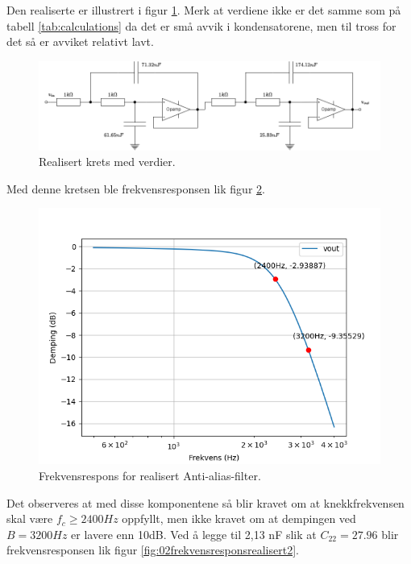 Den realiserte er illustrert i figur \ref{fig:01realised}. Merk at verdiene ikke er det samme som på tabell \ref{tab:calculations} da det er små avvik i kondensatorene, men til tross for det så er avviket relativt lavt.

\begin{figure}[!hbt]
	\centering
	\includegraphics[scale=0.45]{./Images/03Research/01realisertkrets.png}
	\caption{Realisert krets med verdier.}
	\label{fig:01realised}
\end{figure}

Med denne kretsen ble frekvensresponsen lik figur \ref{fig:02frekvensresponsrealisert}.

\begin{figure}[!hbt]
	\centering
	\includegraphics[scale=0.45]{./Images/03Research/02frekvensrespons.png}
	\caption{Frekvensrespons for realisert Anti-alias-filter.}
	\label{fig:02frekvensresponsrealisert}
\end{figure}

Det observeres at med disse komponentene så blir kravet om at knekkfrekvensen skal være $f_c\geq2400Hz$ oppfyllt, men ikke kravet om at dempingen ved $B=3200Hz$ er lavere enn 10dB. Ved å legge til 2,13 nF slik at $C_{22} = 27.96$ blir frekvensresponsen lik figur \ref{fig:02frekvensresponsrealisert2}.

